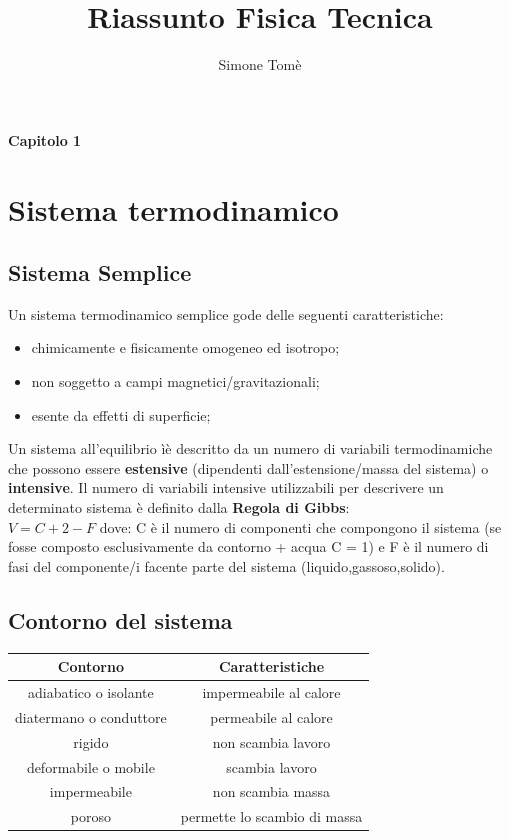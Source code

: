 \documentclass[a4paper,12pt,titlepage]{article}
\title{Riassunto Fisica Tecnica}
\author{Simone Tomè}
\begin{document}
\maketitle
\paragraph{Capitolo 1}
\section{Sistema termodinamico}
\subsection{Sistema Semplice}
Un sistema termodinamico semplice gode delle seguenti caratteristiche: 
\begin{itemize}
\item chimicamente e fisicamente omogeneo ed isotropo;\\
\item non soggetto a campi magnetici/gravitazionali;\\
\item esente da effetti di superficie;\\
\end{itemize} 
Un sistema all'equilibrio ìè descritto da un numero di variabili termodinamiche che possono essere \textbf{estensive} (dipendenti dall'estensione/massa del sistema) o \textbf{intensive}. Il numero di variabili intensive utilizzabili per descrivere un determinato sistema è definito dalla \textbf{Regola di Gibbs}: \\
$V = C + 2 - F $ dove: C è il numero di componenti che compongono il sistema (se fosse composto esclusivamente da contorno + acqua C = 1) e F è il numero di fasi del componente/i facente parte del sistema (liquido,gassoso,solido).
\subsection{Contorno del sistema}
\begin{center}
\begin{tabular}{c | c}
\hline
\textbf{Contorno} & \textbf{Caratteristiche} \\
\hline
adiabatico o isolante & impermeabile al calore \\
\hline
diatermano o conduttore & permeabile al calore \\
\hline
rigido & non scambia lavoro \\
\hline
deformabile o mobile & scambia lavoro \\
\hline
impermeabile & non scambia massa \\
\hline
poroso & permette lo scambio di massa \\
\hline 

\hline
\end{tabular}
\end{center}
\end{document}

